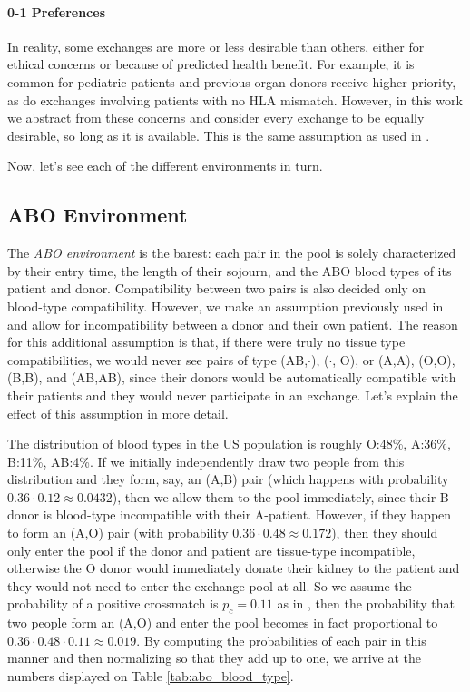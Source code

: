 \documentclass[12pt]{article}
\begin{document}
\paragraph{0-1 Preferences} In reality, some exchanges are more or less desirable than others, either for ethical concerns or because of predicted health benefit. For example, it is common for pediatric patients and previous organ donors receive higher priority, as do exchanges involving patients with no HLA mismatch. However, in this work we abstract from these concerns and consider every exchange to be equally desirable, so long as it is available. This is the same assumption as used in \cite{roth2005pairwise}.


\noindent Now, let's see each of the different environments in turn.  

\subsection{ABO Environment}

The \emph{ABO environment} is the barest: each pair in the pool is solely characterized by their entry time, the length of their sojourn, and the ABO blood types of its patient and donor. Compatibility between two pairs is also decided only on blood-type compatibility. However, we make an assumption previously used in \cite{unver2010dynamic} and allow for incompatibility between a donor and their own patient. The reason for this additional assumption is that, if there were truly no tissue type compatibilities, we would never see pairs of type (AB,$\cdot$), ($\cdot$, O), or (A,A), (O,O), (B,B), and (AB,AB), since their donors would be automatically compatible with their patients and they would never participate in an exchange. Let's explain the effect of this assumption in more detail.

The distribution of blood types in the US population is roughly O:48\%, A:36\%, B:11\%, AB:4\%. If we initially independently draw two people from this distribution and they form, say, an (A,B) pair (which happens with probability $0.36 \cdot 0.12 \approx 0.0432$), then we allow them to the pool immediately, since their B-donor is blood-type incompatible with their A-patient. However, if they happen to form an (A,O) pair (with probability $0.36 \cdot 0.48 \approx 0.172$), then they should only enter the pool if the donor and patient are tissue-type incompatible, otherwise the O donor would immediately donate their kidney to the patient and they would not need to enter the exchange pool at all. So we assume the probability of a positive crossmatch is $p_c = 0.11$ as in \cite{zenios2001primum}, then the probability that two people form an (A,O) and enter the pool becomes in fact proportional to $0.36 \cdot 0.48  \cdot 0.11 \approx 0.019$. By computing the probabilities of each pair in this manner and then normalizing so that they add up to one, we arrive at the numbers displayed on Table \ref{tab:abo_blood_type}. 
\end{document}
